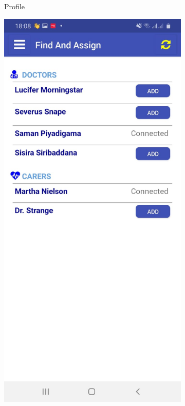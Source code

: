 \begin{figure}
\begin{subfigure}[b]{0.125\textwidth}
        \caption{Profile}
        \label{fig:profile}
    \end{subfigure}
    \hfill %
    \begin{subfigure}[b]{0.125\textwidth}
        \includegraphics[width=\textwidth]{figs/mobapp/img5.jpeg}

\end{subfigure}
\end{figure}
